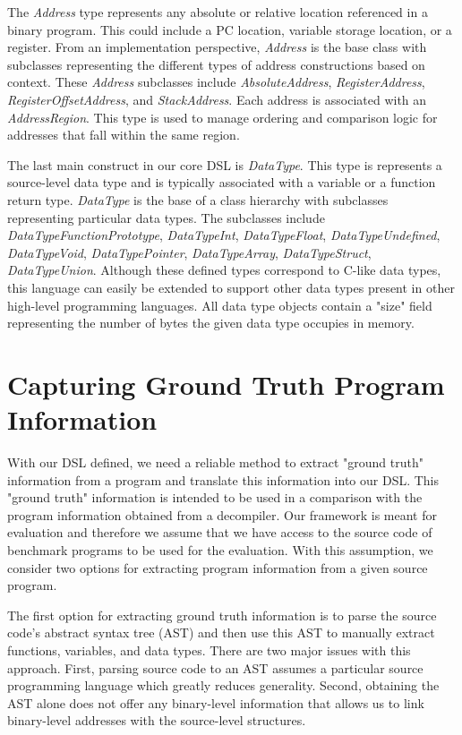 The \emph{Address} type represents any absolute or relative location referenced in a binary program. This could include a PC location, variable storage location, or a register. From an implementation perspective, \emph{Address} is the base class with subclasses representing the different types of address constructions based on context. These \emph{Address} subclasses include \emph{AbsoluteAddress}, \emph{RegisterAddress}, \emph{RegisterOffsetAddress}, and \emph{StackAddress}. Each address is associated with an \emph{AddressRegion}. This type is used to manage ordering and comparison logic for addresses that fall within the same region.

The last main construct in our core DSL is \emph{DataType}. This type is represents a source-level data type and is typically associated with a variable or a function return type. \emph{DataType} is the base of a class hierarchy with subclasses representing particular data types. The subclasses include \emph{DataTypeFunctionPrototype}, \emph{DataTypeInt}, \emph{DataTypeFloat}, \emph{DataTypeUndefined}, \emph{DataTypeVoid}, \emph{DataTypePointer}, \emph{DataTypeArray}, \emph{DataTypeStruct}, \emph{DataTypeUnion}. Although these defined types correspond to C-like data types, this language can easily be extended to support other data types present in other high-level programming languages. All data type objects contain a "size" field representing the number of bytes the given data type occupies in memory.

\section{Capturing Ground Truth Program Information}

With our DSL defined, we need a reliable method to extract "ground truth" information from a program and translate this information into our DSL. This "ground truth" information is intended to be used in a comparison with the program information obtained from a decompiler. Our framework is meant for evaluation and therefore we assume that we have access to the source code of benchmark programs to be used for the evaluation. With this assumption, we consider two options for extracting program information from a given source program.

The first option for extracting ground truth information is to parse the source code's abstract syntax tree (AST) and then use this AST to manually extract functions, variables, and data types. There are two major issues with this approach. First, parsing source code to an AST assumes a particular source programming language which greatly reduces generality. Second, obtaining the AST alone does not offer any binary-level information that allows us to link binary-level addresses with the source-level structures.

